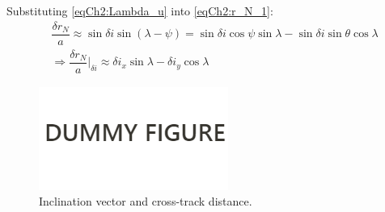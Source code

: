 			\indent Substituting \eqref{eqCh2:Lambda_u} into \eqref{eqCh2:r_N_1}:
			\begin{align}
			&\nonumber \dfrac{\delta r_N}{a} \approx \sin\delta i \sin(\lambda - \psi) = \sin\delta i \cos\psi \sin \lambda - \sin\delta i \sin \theta \cos\lambda \\
			& \label{eqCh2:r_N_2} \Rightarrow \dfrac{\delta r_N}{a}\rvert_{\delta i} \approx \delta i_x \sin \lambda - \delta i_y \cos\lambda
			\end{align}
			\begin{figure}[!htb]
			\centering\includegraphics[width = 0.4\linewidth]{Figures/Dummy_figure}
			\caption{Inclination vector and cross-track distance.}
			\label{figCh2:inc_rN}
			\end{figure}
			\FloatBarrier
